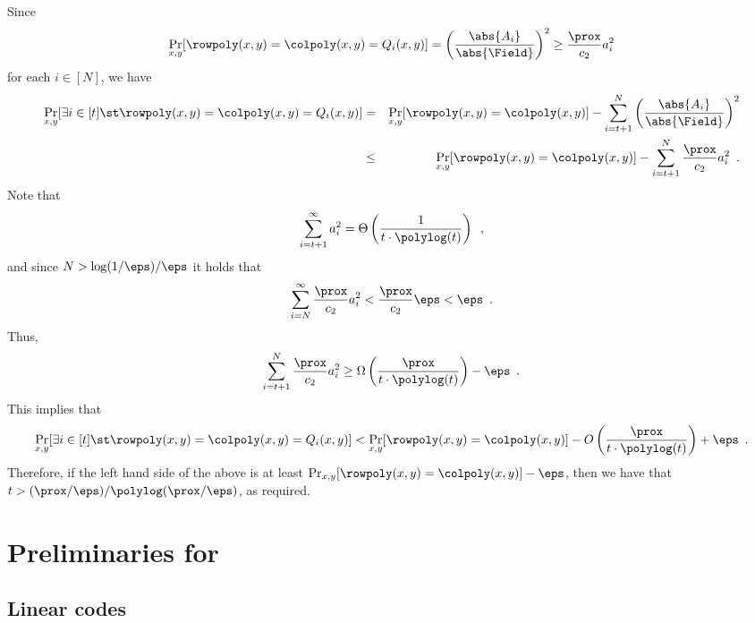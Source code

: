 \documentclass{toc}
\theoremstyle{plain}
\begin{document}
   Since
   \[
     \Pr_{x,y}[\rowpoly(x,y) = \colpoly(x,y) = Q_i(x,y)] = \left(\frac{\abs{A_i}}{\abs{\Field}}\right)^2 \geq \frac{\prox}{c_2} a_i^2
     \]
    for each $i \in [N]$, we have
    \begin{eqnarray*}
        \Pr_{x,y}[\exists i \in [t] \st \rowpoly(x,y) = \colpoly(x,y) = Q_i(x,y)]
        &=& \Pr_{x,y}[\rowpoly(x,y) = \colpoly(x,y)] - \sum_{i=t+1}^N \left(\frac{\abs{A_i}}{\abs{\Field}}\right)^2 \\
        &\leq& \Pr_{x,y}[\rowpoly(x,y) = \colpoly(x,y)] - \sum_{i=t+1}^N \frac{\prox}{c_2} a_i^2
        \enspace.
    \end{eqnarray*}
    Note that
    \[
      \sum_{i=t+1}^\infty a_i^2 = \Theta \left( \frac{1}{t \cdot \polylog(t)} \right)\enspace,
    \]
    and since $N > {\log(1/\eps)}/{\eps}$
    it holds that
    \[
      \sum_{i=N}^{\infty} \frac{\prox}{c_2} a_i^2 < \frac{\prox}{c_2}\eps < \eps\enspace.
    \]
    Thus,
    \[
      \sum_{i=t+1}^N \frac{\prox}{c_2} a_i^2 \geq \Omega \left( \frac{\prox}{t \cdot \polylog(t)} \right) - \eps\enspace.
    \]
    This implies that
    \begin{equation*}
        \Pr_{x,y}[\exists i \in [t] \st \rowpoly(x,y) = \colpoly(x,y) = Q_i(x,y)] < \Pr_{x,y}[\rowpoly(x,y) = \colpoly(x,y)] - O\left(\frac{\prox}{t \cdot \polylog(t)}\right)+ \eps
        \enspace.
    \end{equation*}
    Therefore, if the left hand side of the above is at least $\Pr_{x,y}[\rowpoly(x,y) = \colpoly(x,y)] - \eps $, then we have that $t  > {(\prox/\eps)}/{\polylog(\prox/\eps)}$,
    as required.

%
%
%
\section{Preliminaries for }
\label{sec:prelim-pat}

%
%
\subsection{Linear codes}
\label{sec:linear-codes}
\end{document}
